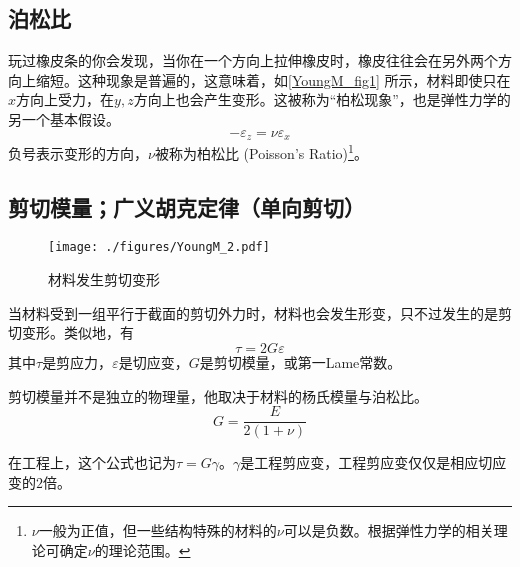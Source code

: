 \subsection{泊松比}
玩过橡皮条的你会发现，当你在一个方向上拉伸橡皮时，橡皮往往会在另外两个方向上缩短。这种现象是普遍的，这意味着，如\autoref{YoungM_fig1} 所示，材料即使只在$x$方向上受力，在$y,z$方向上也会产生变形。这被称为“柏松现象”，也是弹性力学的另一个基本假设。
\begin{equation}
-\varepsilon_z= \nu \varepsilon_x
\end{equation}
负号表示变形的方向，$\nu$被称为柏松比 (Poisson's Ratio)\footnote{$\nu$一般为正值，但一些结构特殊的材料的$\nu$可以是负数。根据弹性力学的相关理论可确定$\nu$的理论范围。}。%

\subsection{剪切模量；广义胡克定律（单向剪切）}
\begin{figure}[ht]
\centering
\texttt{[image: ./figures/YoungM\_2.pdf]}
\caption{材料发生剪切变形} \label{YoungM_fig2}
\end{figure}
当材料受到一组平行于截面的剪切外力时，材料也会发生形变，只不过发生的是剪切变形。类似地，有
\begin{equation}
\tau=2G\varepsilon
\end{equation}
其中$\tau$是剪应力，$\varepsilon$是切应变，$G$是剪切模量，或第一Lame常数。

剪切模量并不是独立的物理量，他取决于材料的杨氏模量与泊松比。
\begin{equation}
G = \frac{E}{2(1+\nu)}
\end{equation}

在工程上，这个公式也记为$\tau=G\gamma$。$\gamma$是工程剪应变，工程剪应变仅仅是相应切应变的$2$倍。
